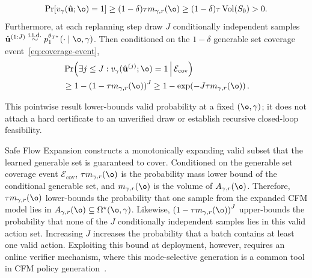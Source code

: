 \begin{corollary}
\begin{equation}
\Pr\!\left[
v_\gamma(\hat{\mathbf u};\o)=1
\right]
\ge
(1-\delta)\tau m_{\gamma,r}(\o)
\ge
(1-\delta)\tau\operatorname{Vol}(S_0)>0.
\label{eq:main1}
\end{equation}
Furthermore, at each replanning step draw \(J\) conditionally independent samples $\hat{\mathbf u}^{(1:J)}
\overset{\mathrm{i.i.d.}}{\sim}p_1^{\theta_{T^\star}}(\cdot\mid\o,\gamma)$. Then conditioned on the \(1-\delta\) generable set coverage event~\eqref{eq:coverage-event},
\begin{align}
&\Pr\!\left(
\exists j\le J:
v_\gamma(\hat{\mathbf u}^{(j)};\o)=1
\,\middle|\,
\mathcal E_{\mathrm{cov}} \notag
\right)\\
&\ge
1-
\left(1-\tau m_{\gamma,r}(\o)\right)^J
\ge
1-\exp\!\left(-J\tau m_{\gamma,r}(\o)\right).
\label{eq:main2}
\end{align}
\end{corollary}
This pointwise result lower-bounds valid probability at a
fixed $(\o,\gamma)$; it does not attach a hard certificate to an
unverified draw or establish recursive closed-loop feasibility.

Safe Flow Expansion constructs a monotonically expanding valid subset that the learned generable set is guaranteed to cover. Conditioned on the generable set coverage event $\mathcal E_{\mathrm{cov}}$,
$\tau m_{\gamma,r}(\o)$ is the probability mass lower bound of the conditional generable set, and $m_{\gamma,r}(\o)$ is the volume of $A_{\gamma,r}(\o)$. Therefore, $\tau m_{\gamma,r}(\o)$ lower-bounds the probability that one sample from the expanded CFM model lies in $A_{\gamma,r}(\o)\subseteq\Omega^\star(\o,\gamma)$. Likewise, $\left(1-\tau m_{\gamma,r}(\o)\right)^J$ upper-bounds the probability that none of the $J$ conditionally independent samples lies in this valid action set. Increasing $J$ increases the probability that a batch contains at least one valid action. Exploiting this bound at deployment, however, requires an online verifier mechanism, where this mode-selective generation is a common tool in CFM policy generation~\cite{mizuta2025unified}.